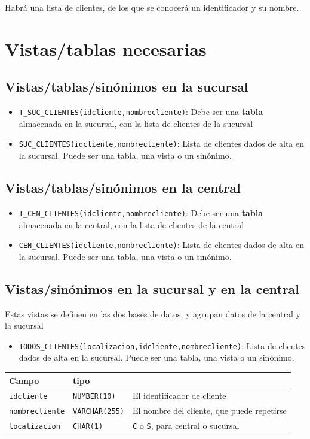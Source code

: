 \documentclass[a4paper]{article}
\begin{document}
Habrá una lista de clientes, de los que se conocerá un identificador y su nombre.

\newpage
\section{Vistas/tablas necesarias}
\label{sec:org000000f}
\subsection{Vistas/tablas/sinónimos en la sucursal}
\label{sec:org0000006}
\begin{itemize}
\item \texttt{T\_SUC\_CLIENTES(idcliente,nombrecliente)}: Debe ser una \textbf{tabla} almacenada en la sucursal, con la lista de clientes de la sucursal
\item \texttt{SUC\_CLIENTES(idcliente,nombrecliente)}: Lista de clientes dados de alta en la sucursal. Puede ser una tabla, una vista o un sinónimo.
\end{itemize}

\subsection{Vistas/tablas/sinónimos en la central}
\label{sec:org0000009}
\begin{itemize}
\item \texttt{T\_CEN\_CLIENTES(idcliente,nombrecliente)}: Debe ser una \textbf{tabla} almacenada en la central, con la lista de clientes de la central
\item \texttt{CEN\_CLIENTES(idcliente,nombrecliente)}: Lista de clientes dados de alta en la sucursal. Puede ser una tabla, una vista o un sinónimo.
\end{itemize}

\subsection{Vistas/sinónimos en la sucursal y en la central}
\label{sec:org000000c}
Estas vistas se definen en las dos bases de datos, y agrupan datos de la central y la sucursal
\begin{itemize}
\item \texttt{TODOS\_CLIENTES(localizacion,idcliente,nombrecliente)}: Lista de clientes dados de alta en la sucursal. Puede ser una tabla, una vista o un sinónimo.
\end{itemize}


\begin{center}
\begin{tabular}{lll}
Campo & tipo & \\[0pt]
\hline
\texttt{idcliente} & \texttt{NUMBER(10)} & El identificador de cliente\\[0pt]
\texttt{nombrecliente} & \texttt{VARCHAR(255)} & El nombre del cliente, que puede repetirse\\[0pt]
\texttt{localizacion} & \texttt{CHAR(1)} & \texttt{C} o \texttt{S}, para central o sucursal\\[0pt]
\end{tabular}
\end{center}
\end{document}
